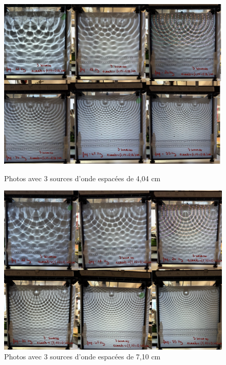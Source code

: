 \documentclass{report}
\begin{document}
\begin{figure}[H]
\centering
\begin{minipage}{0.45\textwidth}
  \centering
  \includegraphics[scale=0.14]{S3P.jpg}
  \caption{Photos avec 3 sources d'onde espacées de 4,04 cm}
  \label{fig:s1}
\end{minipage}\hfill
\begin{minipage}{0.45\textwidth}
  \centering
  \includegraphics[scale=0.14]{S3M.jpg}
  \caption{Photos avec 3 sources d'onde espacées de 7,10 cm}
  \label{fig:s2}
\end{minipage}
\end{figure}
\end{document}
